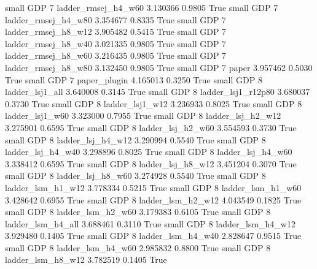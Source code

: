      small      GDP                 7      ladder_rmsej_h4_w60   3.130366      0.9805    True
     small      GDP                 7      ladder_rmsej_h4_w80   3.354677      0.8335    True
     small      GDP                 7      ladder_rmsej_h8_w12   3.905482      0.5415    True
     small      GDP                 7      ladder_rmsej_h8_w40   3.021335      0.9805    True
     small      GDP                 7      ladder_rmsej_h8_w60   3.216435      0.9805    True
     small      GDP                 7      ladder_rmsej_h8_w80   3.132450      0.9805    True
     small      GDP                 7                    paper   3.957462      0.5030    True
     small      GDP                 7             paper_plugin   4.165013      0.3250    True
     small      GDP                 8          ladder_lsj1_all   3.640008      0.3145    True
     small      GDP                 8       ladder_lsj1_r12p80   3.680037      0.3730    True
     small      GDP                 8          ladder_lsj1_w12   3.236933      0.8025    True
     small      GDP                 8          ladder_lsj1_w60   3.323000      0.7955    True
     small      GDP                 8        ladder_lsj_h2_w12   3.275901      0.6595    True
     small      GDP                 8        ladder_lsj_h2_w60   3.554593      0.3730    True
     small      GDP                 8        ladder_lsj_h4_w12   3.290994      0.5540    True
     small      GDP                 8        ladder_lsj_h4_w40   3.298896      0.8025    True
     small      GDP                 8        ladder_lsj_h4_w60   3.338412      0.6595    True
     small      GDP                 8        ladder_lsj_h8_w12   3.451204      0.3070    True
     small      GDP                 8        ladder_lsj_h8_w60   3.274928      0.5540    True
     small      GDP                 8        ladder_lsm_h1_w12   3.778334      0.5215    True
     small      GDP                 8        ladder_lsm_h1_w60   3.428642      0.6955    True
     small      GDP                 8        ladder_lsm_h2_w12   4.043549      0.1825    True
     small      GDP                 8        ladder_lsm_h2_w60   3.179383      0.6105    True
     small      GDP                 8        ladder_lsm_h4_all   3.688461      0.3110    True
     small      GDP                 8        ladder_lsm_h4_w12   3.929480      0.1405    True
     small      GDP                 8        ladder_lsm_h4_w40   2.828647      0.9515    True
     small      GDP                 8        ladder_lsm_h4_w60   2.985832      0.8800    True
     small      GDP                 8        ladder_lsm_h8_w12   3.782519      0.1405    True
